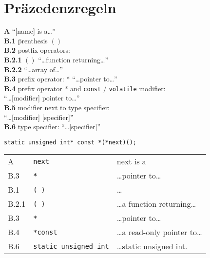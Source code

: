 \section{Präzedenzregeln}%
\begin{tabbing}
\textbf{A} \=\enquote{[name] is a\dots}\\
  \>\textbf{B.1} \=prenthesis {\color{red}$( )$}\\
  \>\textbf{B.2} \>postfix operators:\\
  \>    \>\textbf{B.2.1} \={\color{red}$( )$}    \=\enquote{\dots function returning\dots}\\
  \>    \>\textbf{B.2.2} \>{\color{red}$[ ]$} \>\enquote{\dots array of\dots}\\
  \>\textbf{B.3} \>prefix operator: {\color{red}*} \enquote{\dots pointer to\dots}\\
  \>\textbf{B.4} \>prefix operator {\color{red}*} and {\color{red}\texttt{const} / \texttt{volatile}} modifier:\\
  \>    \>\enquote{\dots [modifier] pointer to\dots}\\
  \>\textbf{B.5}  modifier next to type specifier:\\
  \>    \>\enquote{\dots [modifier] [specifier]}\\
  \>\textbf{B.6} \>type specifier: \enquote{\dots [specifier]}
\end{tabbing}

\texttt{static unsigned int* const *(*next)();}

\begin{table}[htp]
    \centering
    \begin{tabular}{lll}
      A     & \texttt{next}                & next is a                     \\
      B.3   & \texttt{*}                   & \dots pointer to\dots           \\
      B.1   & \texttt{( )}                 & \dots                           \\
      B.2.1 & \texttt{( )}                 & \dots a function returning\dots   \\
      B.3   & \texttt{*}                   & \dots pointer to\dots             \\
      B.4   & \texttt{*const}              & \dots a read-only pointer to\dots \\
      B.6   & \texttt{static unsigned int} & \dots static unsigned int.      \\
    \end{tabular}
\end{table}

